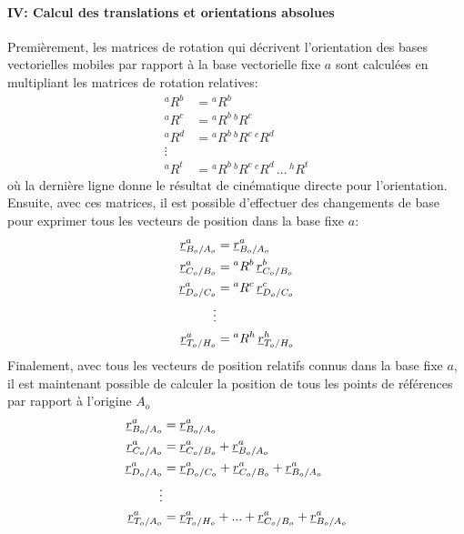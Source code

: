 \paragraph{IV: Calcul des translations et orientations absolues}


Premièrement, les matrices de rotation qui décrivent l'orientation des bases vectorielles mobiles par rapport à la base vectorielle fixe $a$ sont calculées en multipliant les matrices de rotation relatives:
\begin{align}
{}^aR^b &= {}^aR^b \\
{}^aR^c &= {}^aR^b \, {}^bR^c \\
{}^aR^d &= {}^aR^b \, {}^bR^c \, {}^cR^d \\
\vdots  & \nonumber \\
{}^aR^t &= {}^aR^b \, {}^bR^c \, {}^cR^d   \, ...  \, {}^hR^t
\end{align}
où la dernière ligne donne le résultat de cinématique directe pour l'orientation. Ensuite, avec ces matrices, il est possible d'effectuer des changements de base pour exprimer tous les vecteurs de position dans la base fixe $a$:
\begin{align}
	\underline{r}_{B_o/A_o}^a &= \underline{r}_{B_o/A_o}^a \\
	\underline{r}_{C_o/B_o}^a &= {}^aR^b \, \underline{r}_{C_o/B_o}^b \\
	\underline{r}_{D_o/C_o}^a &= {}^aR^c \, \underline{r}_{D_o/C_o}^c \\
	\vdots  & \nonumber \\
	\underline{r}_{T_o/H_o}^a &= {}^aR^h \, \underline{r}_{T_o/H_o}^h
\end{align}
Finalement, avec tous les vecteurs de position relatifs connus dans la base fixe $a$, il est maintenant possible de calculer la position de tous les points de références par rapport à l'origine $A_o$
\begin{align}
	\underline{r}_{B_o/A_o}^a &= \underline{r}_{B_o/A_o}^a \\
	\underline{r}_{C_o/A_o}^a &= \underline{r}_{C_o/B_o}^a + \underline{r}_{B_o/A_o}^a \\
	\underline{r}_{D_o/A_o}^a &= \underline{r}_{D_o/C_o}^a + \underline{r}_{C_o/B_o}^a + \underline{r}_{B_o/A_o}^a \\
	\vdots  & \nonumber \\
	\underline{r}_{T_o/A_o}^a &= \underline{r}_{T_o/H_o}^a +  ... + \underline{r}_{C_o/B_o}^a + \underline{r}_{B_o/A_o}^a
\end{align}

